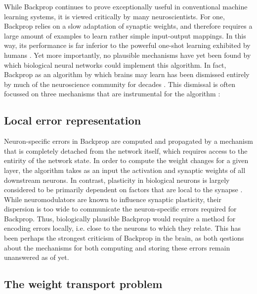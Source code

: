 While Backprop continues to prove exceptionally useful in conventional machine learning systems, it is viewed critically
by many neuroscientists. For one, Backprop relies on a slow adaptation of synaptic weights, and therefore requires a
large amount of examples to learn rather simple input-output mappings. In this way, its performance is far inferior to
the powerful one-shot learning exhibited by humans \citep{Brea2016}. Yet more importantly, no plausible mechanisms have
yet been found by which biological neural networks could implement this algorithm. In fact, Backprop as an algorithm by
which brains may learn has been dismissed entirely by much of the neuroscience community for decades
\citep{Grossberg1987,Crick1989,Mazzoni1991,OReilly1996}. This dismissal is often focussed on three mechanisms that are
instrumental for the algorithm \citep{whittington2019theories,Bengio2015,Liao2016}:



\subsection{Local error representation}

Neuron-specific errors in Backprop are computed and propagated by a mechanism that is completely detached from the
network itself, which requires access to the entirity of the network state. In order to compute the weight changes for a
given layer, the algorithm takes as an input the activation and synaptic weights of all downstream neurons. In contrast,
plasticity in biological neurons is largely considered to be primarily dependent on factors that are local to the
synapse \citep{Abbott2000,magee2020synaptic,urbanczik2014learning}. While neuromodulators are known to influence
synaptic plasticity, their dispersion is too wide to communicate the neuron-specific errors required for Backprop. Thus,
biologically plausible Backprop would require a method for encoding errors locally, i.e. close to the neurons to which
they relate. This has been perhaps the strongest criticism of Backprop in the brain, as both qestions about the
mechanisms for both computing and storing these errors remain unanswered as of yet.

\subsection{The weight transport problem}

